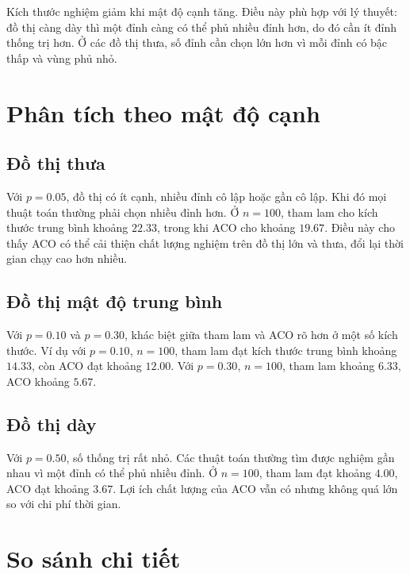 \documentclass[12pt, a4paper]{report}
\begin{document}
Kích thước nghiệm giảm khi mật độ cạnh tăng. Điều này phù hợp với lý thuyết: đồ thị càng dày thì một
đỉnh càng có thể phủ nhiều đỉnh hơn, do đó cần ít đỉnh thống trị hơn. Ở các đồ thị thưa, số đỉnh cần chọn
lớn hơn vì mỗi đỉnh có bậc thấp và vùng phủ nhỏ.

\section{Phân tích theo mật độ cạnh}

\subsection{Đồ thị thưa}

Với $p=0.05$, đồ thị có ít cạnh, nhiều đỉnh cô lập hoặc gần cô lập. Khi đó mọi thuật toán thường phải chọn
nhiều đỉnh hơn. Ở $n=100$, tham lam cho kích thước trung bình khoảng $22.33$, trong khi ACO cho khoảng
$19.67$. Điều này cho thấy ACO có thể cải thiện chất lượng nghiệm trên đồ thị lớn và thưa, đổi lại thời
gian chạy cao hơn nhiều.

\subsection{Đồ thị mật độ trung bình}

Với $p=0.10$ và $p=0.30$, khác biệt giữa tham lam và ACO rõ hơn ở một số kích thước. Ví dụ với $p=0.10$,
$n=100$, tham lam đạt kích thước trung bình khoảng $14.33$, còn ACO đạt khoảng $12.00$. Với $p=0.30$,
$n=100$, tham lam khoảng $6.33$, ACO khoảng $5.67$.

\subsection{Đồ thị dày}

Với $p=0.50$, số thống trị rất nhỏ. Các thuật toán thường tìm được nghiệm gần nhau vì một đỉnh có thể phủ
nhiều đỉnh. Ở $n=100$, tham lam đạt khoảng $4.00$, ACO đạt khoảng $3.67$. Lợi ích chất lượng của ACO vẫn
có nhưng không quá lớn so với chi phí thời gian.

\section{So sánh chi tiết}
\end{document}
